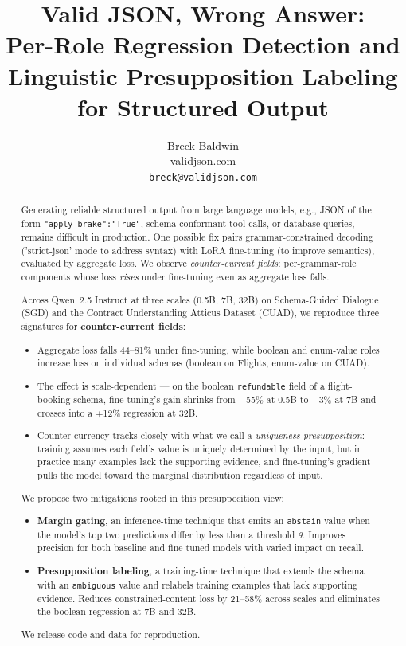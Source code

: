 \documentclass{article}
\title{Valid JSON, Wrong Answer:\\Per-Role Regression Detection and\\Linguistic Presupposition Labeling for Structured Output}
\author{%
  Breck Baldwin \\
  validjson.com \\
  \texttt{breck@validjson.com}
}
\begin{document}
\maketitle

\begin{abstract}
Generating reliable structured output from large language models, e.g., JSON of the form \texttt{"apply\_brake":"True"}, schema-conformant tool calls, or database queries, remains difficult in production. One possible fix pairs grammar-constrained decoding ('strict-json' mode to address syntax) with LoRA fine-tuning (to improve semantics), evaluated by aggregate loss. We observe \emph{counter-current fields}: per-grammar-role components whose loss \emph{rises} under fine-tuning even as aggregate loss falls. 

Across Qwen~2.5 Instruct at three scales (0.5B, 7B, 32B) on Schema-Guided Dialogue (SGD) and the Contract Understanding Atticus Dataset (CUAD), we reproduce three signatures for \textbf{counter-current fields}:

\begin{itemize}
\item Aggregate loss falls 44--81\% under fine-tuning, while boolean and enum-value roles increase loss on individual schemas (boolean on Flights, enum-value on CUAD).
\item The effect is scale-dependent --- on the boolean \texttt{refundable} field of a flight-booking schema, fine-tuning's gain shrinks from $-$55\% at 0.5B to $-$3\% at 7B and crosses into a $+$12\% regression at 32B.
\item Counter-currency tracks closely with what we call a \emph{uniqueness presupposition}: training assumes each field's value is uniquely determined by the input, but in practice many examples lack the supporting evidence, and fine-tuning's gradient pulls the model toward the marginal distribution regardless of input.
\end{itemize}

We propose two mitigations rooted in this presupposition view:
\begin{itemize}
\item \textbf{Margin gating}, an inference-time technique that emits an \texttt{abstain} value when the model's top two predictions differ by less than a threshold $\theta$. Improves precision for both baseline and fine tuned models with varied impact on recall. 
\item \textbf{Presupposition labeling}, a training-time technique that extends the schema with an \texttt{ambiguous} value and relabels training examples that lack supporting evidence. Reduces constrained-content loss by 21--58\% across scales and eliminates the boolean regression at 7B and 32B.
\end{itemize}

We release code and data for reproduction.
\end{abstract}
\end{document}
